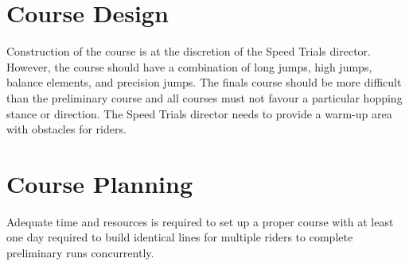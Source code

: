 \section{Course Design}

Construction of the course is at the discretion of the Speed Trials director.
However, the course should have a combination of long jumps, high jumps, balance elements, and precision jumps.
The finals course should be more difficult than the preliminary course and all courses must not favour a particular hopping stance or direction.
The Speed Trials director needs to provide a warm-up area with obstacles for riders.

\section{Course Planning}

Adequate time and resources is required to set up a proper course with at least one day required to build identical lines for multiple riders to complete preliminary runs concurrently.
